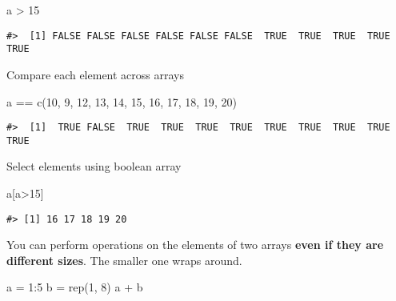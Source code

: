 \documentclass[
]{book}
\newenvironment{Shaded}{\begin{snugshade}}{\end{snugshade}}
\newcommand{\DecValTok}[1]{\textcolor[rgb]{0.00,0.00,0.81}{#1}}
\newcommand{\FunctionTok}[1]{\textcolor[rgb]{0.00,0.00,0.00}{#1}}
\newcommand{\NormalTok}[1]{#1}
\newcommand{\OtherTok}[1]{\textcolor[rgb]{0.56,0.35,0.01}{#1}}
\newcommand{\SpecialCharTok}[1]{\textcolor[rgb]{0.00,0.00,0.00}{#1}}
\begin{document}
\begin{Shaded}
\begin{Highlighting}[]
\NormalTok{a }\SpecialCharTok{\textgreater{}} \DecValTok{15}
\end{Highlighting}
\end{Shaded}

\begin{verbatim}
#>  [1] FALSE FALSE FALSE FALSE FALSE FALSE  TRUE  TRUE  TRUE  TRUE  TRUE
\end{verbatim}

Compare each element across arrays

\begin{Shaded}
\begin{Highlighting}[]
\NormalTok{a }\SpecialCharTok{==} \FunctionTok{c}\NormalTok{(}\DecValTok{10}\NormalTok{, }\DecValTok{9}\NormalTok{, }\DecValTok{12}\NormalTok{, }\DecValTok{13}\NormalTok{, }\DecValTok{14}\NormalTok{, }\DecValTok{15}\NormalTok{, }\DecValTok{16}\NormalTok{, }\DecValTok{17}\NormalTok{, }\DecValTok{18}\NormalTok{, }\DecValTok{19}\NormalTok{, }\DecValTok{20}\NormalTok{)}
\end{Highlighting}
\end{Shaded}

\begin{verbatim}
#>  [1]  TRUE FALSE  TRUE  TRUE  TRUE  TRUE  TRUE  TRUE  TRUE  TRUE  TRUE
\end{verbatim}

Select elements using boolean array

\begin{Shaded}
\begin{Highlighting}[]
\NormalTok{a[a}\SpecialCharTok{\textgreater{}}\DecValTok{15}\NormalTok{]}
\end{Highlighting}
\end{Shaded}

\begin{verbatim}
#> [1] 16 17 18 19 20
\end{verbatim}

You can perform operations on the elements of two arrays \textbf{even if they are different sizes}. The smaller one wraps around.

\begin{Shaded}
\begin{Highlighting}[]
\NormalTok{a }\OtherTok{=} \DecValTok{1}\SpecialCharTok{:}\DecValTok{5}
\NormalTok{b }\OtherTok{=} \FunctionTok{rep}\NormalTok{(}\DecValTok{1}\NormalTok{, }\DecValTok{8}\NormalTok{)}
\NormalTok{a }\SpecialCharTok{+}\NormalTok{ b}
\end{Highlighting}
\end{Shaded}
\end{document}
